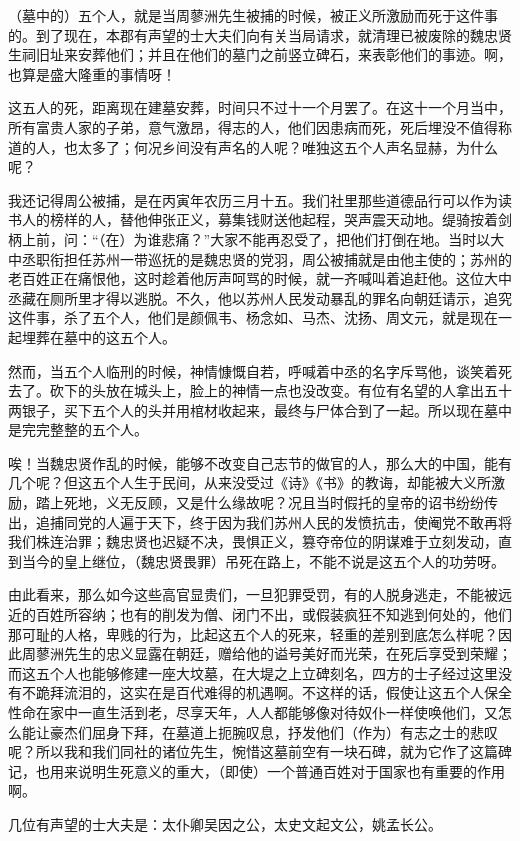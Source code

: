 \documentclass[12pt,UTF-8,openany]{ctexbook}
\begin{document}
\begin{normalsize}
    
    （墓中的）五个人，就是当周蓼洲先生被捕的时候，被正义所激励而死于这件事的。到了现在，本郡有声望的士大夫们向有关当局请求，就清理已被废除的魏忠贤生祠旧址来安葬他们；并且在他们的墓门之前竖立碑石，来表彰他们的事迹。啊，也算是盛大隆重的事情呀！
    
    这五人的死，距离现在建墓安葬，时间只不过十一个月罢了。在这十一个月当中，所有富贵人家的子弟，意气激昂，得志的人，他们因患病而死，死后埋没不值得称道的人，也太多了；何况乡间没有声名的人呢？唯独这五个人声名显赫，为什么呢？
    
    我还记得周公被捕，是在丙寅年农历三月十五。我们社里那些道德品行可以作为读书人的榜样的人，替他伸张正义，募集钱财送他起程，哭声震天动地。缇骑按着剑柄上前，问：“（在）为谁悲痛？”大家不能再忍受了，把他们打倒在地。当时以大中丞职衔担任苏州一带巡抚的是魏忠贤的党羽，周公被捕就是由他主使的；苏州的老百姓正在痛恨他，这时趁着他厉声呵骂的时候，就一齐喊叫着追赶他。这位大中丞藏在厕所里才得以逃脱。不久，他以苏州人民发动暴乱的罪名向朝廷请示，追究这件事，杀了五个人，他们是颜佩韦、杨念如、马杰、沈扬、周文元，就是现在一起埋葬在墓中的这五个人。
    
    然而，当五个人临刑的时候，神情慷慨自若，呼喊着中丞的名字斥骂他，谈笑着死去了。砍下的头放在城头上，脸上的神情一点也没改变。有位有名望的人拿出五十两银子，买下五个人的头并用棺材收起来，最终与尸体合到了一起。所以现在墓中是完完整整的五个人。
    
    唉！当魏忠贤作乱的时候，能够不改变自己志节的做官的人，那么大的中国，能有几个呢？但这五个人生于民间，从来没受过《诗》《书》的教诲，却能被大义所激励，踏上死地，义无反顾，又是什么缘故呢？况且当时假托的皇帝的诏书纷纷传出，追捕同党的人遍于天下，终于因为我们苏州人民的发愤抗击，使阉党不敢再将我们株连治罪；魏忠贤也迟疑不决，畏惧正义，篡夺帝位的阴谋难于立刻发动，直到当今的皇上继位，（魏忠贤畏罪）吊死在路上，不能不说是这五个人的功劳呀。
    
    由此看来，那么如今这些高官显贵们，一旦犯罪受罚，有的人脱身逃走，不能被远近的百姓所容纳；也有的削发为僧、闭门不出，或假装疯狂不知逃到何处的，他们那可耻的人格，卑贱的行为，比起这五个人的死来，轻重的差别到底怎么样呢？因此周蓼洲先生的忠义显露在朝廷，赠给他的谥号美好而光荣，在死后享受到荣耀；而这五个人也能够修建一座大坟墓，在大堤之上立碑刻名，四方的士子经过这里没有不跪拜流泪的，这实在是百代难得的机遇啊。不这样的话，假使让这五个人保全性命在家中一直生活到老，尽享天年，人人都能够像对待奴仆一样使唤他们，又怎么能让豪杰们屈身下拜，在墓道上扼腕叹息，抒发他们（作为）有志之士的悲叹呢？所以我和我们同社的诸位先生，惋惜这墓前空有一块石碑，就为它作了这篇碑记，也用来说明生死意义的重大，（即使）一个普通百姓对于国家也有重要的作用啊。
    
    几位有声望的士大夫是：太仆卿吴因之公，太史文起文公，姚孟长公。
    
\end{normalsize}
\end{document}
